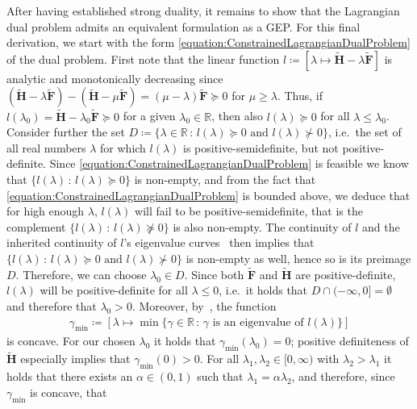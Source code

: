 \documentclass[10pt,conference]{IEEEtran}
\newcommand*{\R}{\mathbb{R}}          %
\newcommand*{\defcolon}{\,:\,}        %
\begin{document}
After having established strong duality, it remains to show that the Lagrangian dual problem admits an equivalent formulation as a GEP.
For this final derivation, we start with the form \eqref{equation:ConstrainedLagrangianDualProblem} of the dual problem.
First note that the linear function $l \coloneqq [\lambda \mapsto \tilde{\bm{H}} - \lambda \tilde{\bm{F}}]$ is analytic and monotonically decreasing since $(\tilde{\bm{H}} - \lambda \tilde{\bm{F}}) - (\tilde{\bm{H}} - \mu \tilde{\bm{F}}) = (\mu - \lambda) \tilde{\bm{F}} \succeq 0$ for $\mu \ge \lambda$.
Thus, if $l(\lambda_{0}) = \tilde{\bm{H}} - \lambda_{0} \tilde{\bm{F}} \succeq 0$ for a given $\lambda_{0} \in \R$, then also $l(\lambda) \succeq 0$ for all $\lambda \leq \lambda_{0}$.
Consider further the set $D \coloneqq \{\lambda \in \R \defcolon l(\lambda) \succeq 0 \text{ and } l(\lambda) \not\succ 0\}$, i.e.\ the set of all real numbers $\lambda$ for which $l(\lambda)$ is positive-semidefinite, but not positive-definite.
Since \eqref{equation:ConstrainedLagrangianDualProblem} is feasible we know that $\{l(\lambda) \defcolon l(\lambda) \succeq 0\}$ is non-empty, and from the fact that \eqref{equation:ConstrainedLagrangianDualProblem} is bounded above, we deduce that for high enough $\lambda$, $l(\lambda)$ will fail to be positive-semidefinite, that is the complement $\{l(\lambda) \defcolon l(\lambda) \not\succeq 0\}$ is also non-empty.
The continuity of $l$ and the inherited continuity of $l$'s eigenvalue curves~\cite{Kato1995PerturbationTheoryForLinearOperators} then implies that $\{l(\lambda) \defcolon l(\lambda) \succeq 0 \text{ and } l(\lambda) \not\succ 0\}$ is non-empty as well, hence so is its preimage $D$.
Therefore, we can choose $\lambda_{0} \in D$.
Since both $\tilde{\bm{F}}$ and $\tilde{\bm{H}}$ are positive-definite, $l(\lambda)$ will be positive-definite for all $\lambda \leq 0$, i.e.\ it holds that $D \cap (-\infty, 0] = \emptyset$ and therefore that $\lambda_{0} > 0$.
Moreover, by~\cite[Problem 6.2]{Kato1995PerturbationTheoryForLinearOperators}, the function
\begin{align*}
    \gamma_{\min} \coloneqq [\lambda \mapsto \min\{\gamma \in \R \defcolon \gamma \text{ is an eigenvalue of } l(\lambda)\}]
\end{align*}
is concave.
For our chosen $\lambda_{0}$ it holds that $\gamma_{\min}(\lambda_{0}) = 0$;
positive definiteness of $\tilde{\bm{H}}$ especially implies that $\gamma_{\min}(0) > 0$.
For all $\lambda_{1}, \lambda_{2} \in [0, \infty)$ with $\lambda_{2} > \lambda_{1}$ it holds that there exists an $\alpha \in (0, 1)$ such that $\lambda_{1} = \alpha \lambda_{2}$, and therefore, since $\gamma_{\min}$ is concave, that
\end{document}
